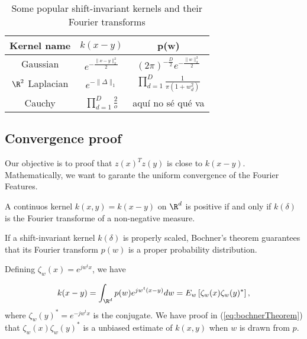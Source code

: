 \begin{table}[h!]
    \centering
    \begin{tabular}{|c|c|c|}
    \hline
     Kernel name & $k(x-y)$ & p(w) \\
     \hline
     Gaussian 
     & $e^{- \frac{\| x- y\|^2_2}{2}}$
    & 
    $(2 \pi)^{-\frac{D}{2}} e^{- \frac{\| w\|^2_2}{2}}$ 
    \\
    \hline
        $\R^2$ Laplacian 
        & 
        $e^{
            - \|\Delta\|_1
        }$
        &
        $\prod_{d = 1}^D \frac{1}{\pi(1+w_d^2)}$
        \\
    \hline
        Cauchy 
        &
        $\prod_{d = 1}^D \frac{2}{o}$
        &
        aquí no sé qué va
    \\
    \hline
    \end{tabular}
    \caption{Some popular shift-invariant kernels and their Fourier transforms}
\end{table}


\subsection{Convergence proof}

Our objective is to proof that $z(x)^Tz(y)$ is close to $k(x-y)$. 
Mathematically, we want to garante the uniform convergence of the Fourier Features. 


\begin{theorem}
    A continuos kernel $k(x,y) = k(x-y)$ on $\R^d$ is positive 
    if and only if $k(\delta)$ is the Fourier transforme of a non-negative measure. 
\end{theorem}

If a shift-invariant kernel $k(\delta)$ is properly scaled, Bochner’s theorem guarantees that its Fourier transform 
$p(w)$
is a proper probability distribution.

Defining $\zeta_w(x) = e^{jw^tx}$, we have

\begin{equation}
    \label{eq:bochnerTheorem}
    k(x-y)
    =
    \int_{\R^d}
    p(w)
    e^{jw^t(x-y)}
    dw
    = 
    E_w\left[
        \zeta_w(x)
        \zeta_w(y)^*
    \right],
\end{equation}
where $\zeta_w(y)^* =  e^{- jw^tx}$ is the conjugate. 
We have proof in (\ref{eq:bochnerTheorem}) that $  \zeta_w(x)
\zeta_w(y)^*$ is a unbiased estimate of $k(x,y)$ when $w$ is drawn from $p$. 

